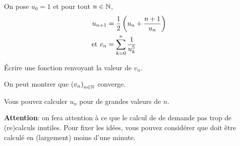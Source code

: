\question On pose $u_{0} = 1$ et pour tout $n\in \mathbb{N}$,
\begin{align*}
  u_{n+1} &= \frac{1}{2}\left(u_{n}+\frac{n+1}{u_{n}}\right)\\
\text{et } v_{n} &= \sum_{k=0}^{n} \frac{1}{u_{k}^{5}}
\end{align*}

Écrire une fonction  renvoyant la valeur de
  $v_{n}$.

On peut montrer que $\left(v_{n}\right)_{n\in \mathbb{N}}$ converge.

Vous pouvez calculer $u_{n}$ pour de grandes valeurs de $n$.

\textbf{Attention}: on fera attention à ce que le calcul de 
de demande  pas trop  de (re)calculs inutiles.  Pour fixer  les idées,
vous  pouvez considérer  que   doit  être calculé  en
(largement) moins d'une minute.